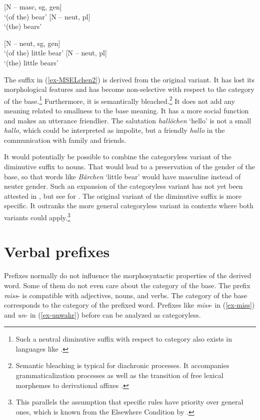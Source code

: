 \documentclass[output=paper
  ,nobabel
  ,draftmode
  ,colorlinks, citecolor=brown
]{langscibook}
\begin{document}
\eal\label{bär}
\ex {} [N – masc, sg, gen{}]\\`(of the) bear' 
\ex {} [N – neut, pl{}]\\ `(the) bears'
\zl

\eal\label{bär-b} 
\ex {} [N – neut, sg, gen]\\ `(of the) little bear'
\ex {} [N – neut, pl]\\ `(the) little bears'
\zl

\noindent The suffix in (\ref{ex-MSELchen2}) is derived from the original variant. It has lost its morphological features and has become non-selective with respect to the category of the base.\footnote{Such a neutral diminutive suffix with respect to category also exists in  languages like  \citep[cf.\ e.g.][]{Scalise1988}.}  Furthermore, it is semantically bleached.\footnote{Semantic bleaching is typical for diachronic processes. It accompanies grammaticalization processes \citep[cf.][Section~3.2]{Szczepaniak2009} as well as the transition of free lexical morphemes to derivational affixes \citep[cf.][Section~2]{NueblingEtAl2010}.} It does not add any meaning related to smallness to the base meaning. It has a more social function and makes an utterance friendlier. The salutation \emph{hallöchen} `hello' is not a small \emph{hallo}, which could be interpreted as impolite, but a friendly \emph{hallo} in the communication with family and friends. 

It would potentially be possible to combine the categoryless variant of the diminutive suffix to nouns. That would lead to a preservation of the gender of the base, so that words like \emph{Bärchen} `little bear' would have masculine instead of neuter gender. Such an expansion of the categoryless variant has not yet been attested in , but see \citet{Edelhoff2017} for . The original variant of the diminutive suffix is more specific. It outranks the more general categoryless variant in contexts where both variants could apply.\footnote{This parallels the assumption that specific rules have priority over general ones, which is known from the Elsewhere Condition by \citet{Kiparsky1973}.}

\section{Verbal prefixes}\label{sec-verbpre}

Prefixes normally do not influence the morphosyntactic properties of the derived word. Some of them do not even care about the category of the base. The prefix \emph{miss}{}- is compatible with adjectives, nouns, and verbs. The category of the base corresponds to the category of the prefixed word. Prefixes like \emph{miss}{}- in (\ref{ex-miss}) and \emph{un}- in (\ref{ex-unwahr}) before can be analyzed as categoryless.
\end{document}
